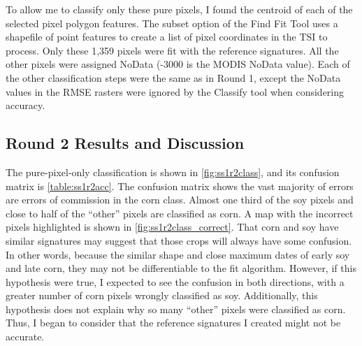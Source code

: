 To allow me to classify only these pure pixels, I found the centroid of each of the selected pixel polygon features. The subset option of the Find Fit Tool uses a shapefile of point features to create a list of pixel coordinates in the TSI to process. Only these 1,359 pixels were fit with the reference signatures. All the other pixels were assigned NoData (-3000 is the MODIS NoData value). Each of the other classification steps were the same as in Round 1, except the NoData values in the RMSE rasters were ignored by the Classify tool when considering accuracy.


\subsection*{Round 2 Results and Discussion}

The pure-pixel-only classification is shown in \cref{fig:ss1r2class}, and its confusion matrix is \autoref{table:ss1r2acc}. The confusion matrix shows the vast majority of errors are errors of commission in the corn class. Almost one third of the soy pixels and close to half of the ``other'' pixels are classified as corn. A map with the incorrect pixels highlighted is shown in \cref{fig:ss1r2class_correct}. That corn and soy have similar signatures may suggest that those crops will always have some confusion. In other words, because the similar shape and close maximum dates of early soy and late corn, they may not be differentiable to the fit algorithm. However, if this hypothesis were true, I expected to see the confusion in both directions, with a greater number of corn pixels wrongly classified as soy. Additionally, this hypothesis does not explain why so many ``other'' pixels were classified as corn. Thus, I began to consider that the reference signatures I created might not be accurate.

